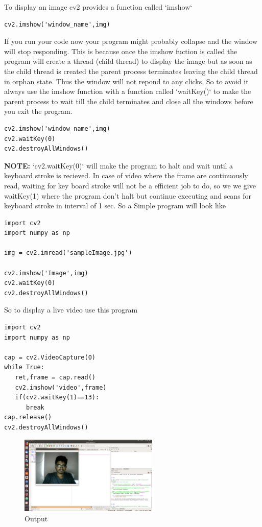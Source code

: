 \documentclass[11pt]{article}
\begin{document}
To display an image cv2 provides a function called `imshow`  
\begin{verbatim}
cv2.imshow('window_name',img)
\end{verbatim}
If you run your code now your program might probably collapse and the window  
will stop responding. This is because once the imshow fuction is called the program  
will create a thread (child thread) to display the image but as soon as the child thread  
is created the parent process terminates leaving the child thread in orphan state.  
Thus the window will not repond to any clicks. So to avoid it always use the imshow function  
with a function called `waitKey()` to make the parent process to wait till the child terminates  
and close all the windows before you exit the program.  
\begin{verbatim}
cv2.imshow('window_name',img)
cv2.waitKey(0)
cv2.destroyAllWindows()
\end{verbatim}
\textbf{\textbf{NOTE:}} `cv2.waitKey(0)` will make the program to halt and wait until a keyboard stroke  
is recieved. In case of video where the frame are continuously read, waiting for key board stroke will  
not be a efficient job to do, so we we give waitKey(1) where the program don't halt but continue executing  
and scans for keyboard stroke in interval of 1 sec.  
\newpage
So a Simple program will look like  
\begin{verbatim}
import cv2
import numpy as np

img = cv2.imread('sampleImage.jpg')

cv2.imshow('Image',img)
cv2.waitKey(0)
cv2.destroyAllWindows()
\end{verbatim}

So to display a live video use this program  
\begin{verbatim}
import cv2
import numpy as np

cap = cv2.VideoCapture(0)
while True:
   ret,frame = cap.read()
   cv2.imshow('video',frame)
   if(cv2.waitKey(1)==13):
      break
cap.release()
cv2.destroyAllWindows()
\end{verbatim}
\begin{figure}[htb]
\centering
\includegraphics[width=250px]{./videoDemo2.png}
\caption{\label{fig1}Output}
\end{figure}
\end{document}
